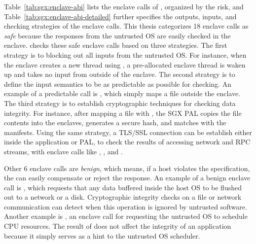Table~\ref{tab:sgx:enclave-abi} lists the \enclavecallnum{} enclave calls of \graphenesgx{},
organized by the risk,
and Table~\ref{tab:sgx:enclave-abi-detailed} further specifies the outputs, inputs, and checking strategies of the enclave calls.
This thesis categorizes
18 enclave calls as {\em safe} because
the responses from the untrusted OS are
easily checked in the enclave.
\graphenesgx{} checks these safe enclave calls based on three strategies.
The first strategy is to blocking out all inputs from the untrusted OS. For instance, when the enclave creates a new thread using , a pre-allocated enclave thread is waken up and takes no input from outside of the enclave.
The second strategy is to define the input semantics to be as predictable as possible for checking. An example of a predictable call is , which simply maps a file outside the enclave.
The third strategy is to establish cryptographic techniques
for checking data integrity.
For instance,
after mapping a file with ,
the SGX PAL copies the file contents into the enclaves, generates a secure hash,
and matches with the manifests.
Using the same strategy, a TLS/SSL connection can be establish either inside the application or PAL,
to check the results of accessing network and RPC streams,
with enclave calls like
, , and .




Other 6 enclave calls are {\em benign}, which means, if a host violates the specification,
the \libos{} can easily compensate or reject the response.
An example of a benign enclave call is ,
which requests that any data buffered inside the host OS to be flushed out to a network or a disk.
Cryptographic integrity checks on a file or network communication can detect when this operation is ignored by untrusted software.
Another example is ,
an enclave call for requesting the untrusted OS to schedule CPU resources.
The result of  does not affect the integrity of an application
because it simply serves as a hint
to the untrusted OS scheduler.



